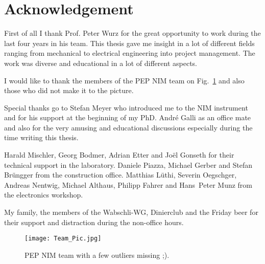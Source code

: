 \documentclass[a4paper, 12pt, abstracton]{scrartcl}
\begin{document}

	
	\newpage
	\thispagestyle{empty}
	\null
	\newpage
	
	\clearpage
	
	\clearpage
	\newpage
	\thispagestyle{empty}
	\null
	\newpage
	
	\clearpage
	
	\clearpage
	
	\clearpage
	\newpage
	\thispagestyle{empty}
	\null
	\newpage
	
	\newpage
	\thispagestyle{empty}
	\null
	\newpage
	
	\section*{Acknowledgement}
	
	First of all I thank Prof. Peter Wurz for the great opportunity to work during the last four years in his team. This thesis gave me insight in a lot of different fields ranging from mechanical to electrical engineering into project management. The work was diverse and educational in a lot of different aspects.
	
	I would like to thank the members of the PEP NIM team on Fig.~\ref{fig:TeamPic} and also those who did not make it to the picture.
	
	Special thanks go to Stefan Meyer who introduced me to the NIM instrument and for his support at the beginning of my PhD. André Galli as an office mate and also for the very amusing and educational discussions especially during the time writing this thesis.
	
	Harald Mischler, Georg Bodmer, Adrian Etter and Joël Gonseth for their technical support in the laboratory. Daniele Piazza, Michael Gerber and Stefan Brüngger from the construction office. Matthias Lüthi, Severin Oegschger, Andreas Nentwig, Michael Althaus, Philipp Fahrer and Hans~Peter Munz from the electronics workshop.
	
	My family, the members of the Wabschli-WG, Dinierclub and the Friday beer for their support and distraction during the non-office hours.
	
	
	
	\begin{figure}[h]
		\centering
		\texttt{[image: Team\_Pic.jpg]}
		\caption{PEP NIM team with a few outliers missing ;).}
		\label{fig:TeamPic}
	\end{figure}
	
	\newpage
	\thispagestyle{empty}
	\null
	\newpage
	
	
	\newpage
	\thispagestyle{empty}
	\null
	\newpage
	
	
	\newpage
	\thispagestyle{empty}
	\null
	\newpage
	
	
\end{document}
